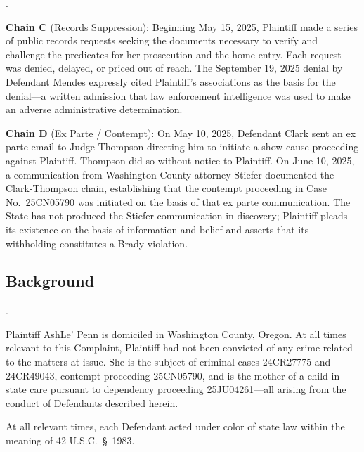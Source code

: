 \documentclass[12pt,letterpaper]{article}
\newcounter{complaintpara}
\newenvironment{paras}{%
	\begin{list}{\arabic{complaintpara}.}{%
			\setlength{\leftmargin}{0.5in}%
			\setlength{\labelwidth}{0.4in}%
			\setlength{\labelsep}{0.1in}%
			\setlength{\itemsep}{0pt}%
			\setlength{\parsep}{0pt}%
			\setlength{\topsep}{6pt}%
		}%
	}{%
	\end{list}%
}
\newcommand{\sect}{§}
\begin{document}
\begin{paras}
		\item\label{fact:chain-c-intro} \textbf{Chain C} (Records
		Suppression): Beginning May 15, 2025, Plaintiff made a series
		of public records requests seeking the documents necessary to
		verify and challenge the predicates for her prosecution and the
		home entry. Each request was denied, delayed, or priced out of
		reach. The September 19, 2025 denial by Defendant Mendes
		expressly cited Plaintiff's associations as the basis for the
		denial---a written admission that law enforcement intelligence
		was used to make an adverse administrative determination.
		
		\item\label{fact:chain-d-intro} \textbf{Chain D} (Ex Parte /
		Contempt): On May 10, 2025, Defendant Clark sent an ex parte
		email to Judge Thompson directing him to initiate a show cause
		proceeding against Plaintiff. Thompson did so without notice to
		Plaintiff. On June 10, 2025, a communication from Washington
		County attorney Stiefer documented the Clark-Thompson chain,
		establishing that the contempt proceeding in Case
		No.\ 25CN05790 was initiated on the basis of that ex parte
		communication. The State has not produced the Stiefer
		communication in discovery; Plaintiff pleads its existence on
		the basis of information and belief and asserts that its
		withholding constitutes a Brady violation.
		
	\end{paras}
	\subsection*{Background}
	\begin{paras}
		
		\item\label{fact:background} Plaintiff AshLe' Penn is domiciled
		in Washington County, Oregon. At all times relevant to this
		Complaint, Plaintiff had not been convicted of any crime
		related to the matters at issue. She is the subject of criminal
		cases 24CR27775 and 24CR49043, contempt proceeding 25CN05790,
		and is the mother of a child in state care pursuant to
		dependency proceeding 25JU04261---all arising from the conduct
		of Defendants described herein.
		
		\item\label{fact:color} At all relevant times, each Defendant
		acted under color of state law within the meaning of
		42 U.S.C.\ \sect\ 1983.
		
	\end{paras}
\end{document}
